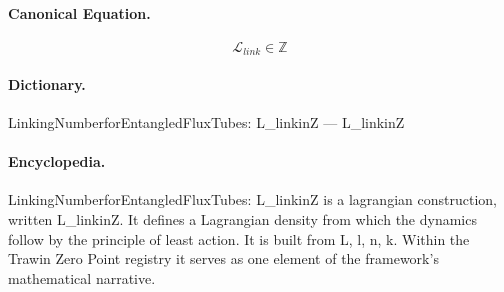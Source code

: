 \paragraph{Canonical Equation.}
\[
\mathcal{L}_{link}\in\mathbb{Z}
\]

\paragraph{Dictionary.}
LinkingNumberforEntangledFluxTubes: L\_linkinZ — L\_linkinZ

\paragraph{Encyclopedia.}
LinkingNumberforEntangledFluxTubes: L\_linkinZ is a lagrangian construction, written L\_linkinZ. It defines a Lagrangian density from which the dynamics follow by the principle of least action. It is built from L, l, n, k. Within the Trawin Zero Point registry it serves as one element of the framework's mathematical narrative.
